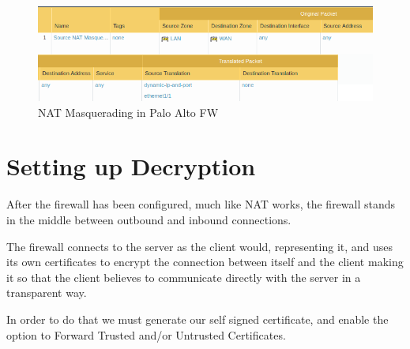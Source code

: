 \begin{figure}[!hb]
 \centering
 \includegraphics[width=13cm]{img/NAT_Masquerade.png}
 \caption{NAT Masquerading in Palo Alto FW}
 \label{NAT Masquerade}
\end{figure}


\newpage

\section{Setting up Decryption}

After the firewall has been configured, much like NAT works, the firewall stands in the middle between outbound and inbound connections.

The firewall connects to the server as the client would, representing it, and uses its own certificates to encrypt the connection between itself and the client making it so that the client believes to communicate directly with the server in a transparent way.

In order to do that we must generate our self signed certificate, and enable the option to Forward Trusted and/or Untrusted Certificates.

